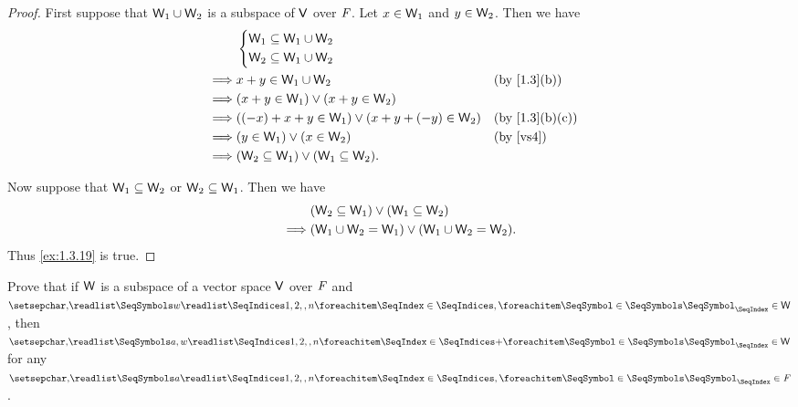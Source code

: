 \begin{proof}
  First suppose that \(\mathsf{W}_{1} \cup \mathsf{W}_{2}\) is a subspace of \(\mathsf{V}\) over \(\mathit{F}\).
  Let \(x \in \mathsf{W}_{1}\) and \(y \in \mathsf{W}_{2}\).
  Then we have
  \begin{align*}
             & \begin{dcases}
      \W_{1} \subseteq \W_{1} \cup \W_{2} \\
      \W_{2} \subseteq \W_{1} \cup \W_{2}
    \end{dcases}                                                                         \\
    \implies & x + y \in \W_{1} \cup \W_{2}                                     &  & \text{(by \cref{1.3}(b))}    \\
    \implies & \p{x + y \in \W_{1}} \lor \p{x + y \in \W_{2}}                                                     \\
    \implies & \p{\p{-x} + x + y \in \W_{1}} \lor \p{x + y + \p{-y} \in \W_{2}} &  & \text{(by \cref{1.3}(b)(c))} \\
    \implies & \p{y \in \W_{1}} \lor \p{x \in \W_{2}}                           &  & \text{(by \ref{vs4})}        \\
    \implies & \p{\W_{2} \subseteq \W_{1}} \lor \p{\W_{1} \subseteq \W_{2}}.
  \end{align*}

  Now suppose that \(\mathsf{W}_{1} \subseteq \mathsf{W}_{2}\) or \(\mathsf{W}_{2} \subseteq \mathsf{W}_{1}\).
  Then we have
  \begin{align*}
             & \p{\W_{2} \subseteq \W_{1}} \lor \p{\W_{1} \subseteq \W_{2}}          \\
    \implies & \p{\W_{1} \cup \W_{2} = \W_{1}} \lor \p{\W_{1} \cup \W_{2} = \W_{2}}.
  \end{align*}
  Thus \cref{ex:1.3.19} is true.
\end{proof}

\begin{ex}\label{ex:1.3.20}
  Prove that if \(\mathsf{W}\) is a subspace of a vector space \(\mathsf{V}\) over \(\mathit{F}\) and \(\seq{w}{1,2,,n}{,} \in \W\), then \(\seq{a,w}{1,2,,n}{+} \in \W\) for any \(\seq{a}{1,2,,n}{,} \in \F\).
\end{ex}

